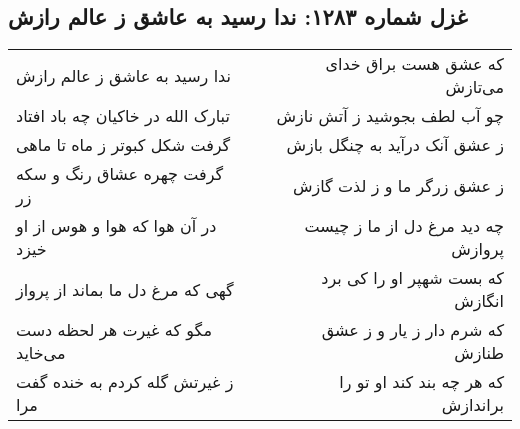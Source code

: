 \begin{center}
\section*{غزل شماره ۱۲۸۳: ندا رسید به عاشق ز عالم رازش}
\label{sec:1283}
\begin{longtable}{l p{0.5cm} r}
ندا رسید به عاشق ز عالم رازش
&&
که عشق هست براق خدای می‌تازش
\\
تبارک الله در خاکیان چه باد افتاد
&&
چو آب لطف بجوشید ز آتش نازش
\\
گرفت شکل کبوتر ز ماه تا ماهی
&&
ز عشق آنک درآید به چنگل بازش
\\
گرفت چهره عشاق رنگ و سکه زر
&&
ز عشق زرگر ما و ز لذت گازش
\\
در آن هوا که هوا و هوس از او خیزد
&&
چه دید مرغ دل از ما ز چیست پروازش
\\
گهی که مرغ دل ما بماند از پرواز
&&
که بست شهپر او را کی برد انگازش
\\
مگو که غیرت هر لحظه دست می‌خاید
&&
که شرم دار ز یار و ز عشق طنازش
\\
ز غیرتش گله کردم به خنده گفت مرا
&&
که هر چه بند کند او تو را براندازش
\\
\end{longtable}
\end{center}

